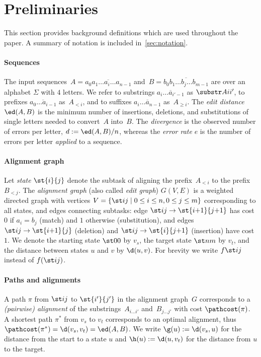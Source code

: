 \section{Preliminaries}\label{sec:preliminaries}

This section provides background definitions which are used throughout the
paper. A summary of notation is included in~\cref{sec:notation}.

\paragraph{Sequences}
The input sequences~$A = \overline{a_0a_1\dots a_i \dots a_{n-1}}$ and~$B =
\overline{b_0b_1 \dots b_j \dots b_{m-1}}$ are over an alphabet $\Sigma$ with
$4$ letters. We refer to substrings $\overline{a_i \dots a_{i'-1}}$ as
$\substr Ai{i'}$, to prefixes $\overline{a_0 \dots a_{i-1}}$ as~$A_{<i}$, and to
suffixes $\overline{a_i \dots a_{n-1}}$ as~$A_{\geq i}$. The \emph{edit
distance} $\ed(A,B)$ is the minimum number of insertions, deletions, and
substitutions of single letters needed to convert~$A$ into~$B$.  The
\emph{divergence} is the observed number of errors per letter, $d:=\ed(A,B)/n$,
whereas the \emph{error rate} $e$ is the number of errors per letter \emph{applied}
to a sequence.

\paragraph{Alignment graph}
Let \emph{state} $\st{i}{j}$ denote the subtask of aligning the prefix~$A_{<i}$
to the prefix~$B_{<j}$. The \emph{alignment graph} (also called \emph{edit
graph}) $G(V,E)$ is a weighted directed graph with vertices $V = \{\st ij \mid
{0\leq i \leq n}, {0\leq j\leq m}\}$ corresponding to all states, and edges
connecting subtasks: edge ${\st ij \to \st{i{+}1}{j{+}1}}$ has cost $0$ if ${a_i
= b_j}$ (match) and $1$ otherwise (substitution), and edges ${\st ij \to
\st{i{+}1}{j}}$ (deletion) and ${\st ij \to\st{i}{j{+}1}}$ (insertion) have cost
$1$. We denote the starting state $\st 00$ by $v_s$, the target state $\st nm$ by
$v_t$, and the distance between states $u$ and $v$ by $\d(u,v)$. For brevity we
write $f \st ij$ instead of $f(\st ij)$.

\paragraph{Paths and alignments}
A path $\pi$ from $\st ij$ to $\st{i'}{j'}$ in the alignment graph~$G$
corresponds to a \emph{(pairwise) alignment} of the substrings~$A_{i \dots i'}$
and~$B_{j \dots j'}$ with cost $\pathcost(\pi)$. A shortest path $\pi^*$ from
$v_s$ to $v_t$ corresponds to an optimal alignment, thus $\pathcost(\pi^*) =
\d(v_s, v_t) = \ed(A, B)$. We write $\g(u) := \d(v_s, u)$ for the distance from
the start to a state $u$ and $\h(u) := \d(u, v_t)$ for the distance from $u$ to
the target.


